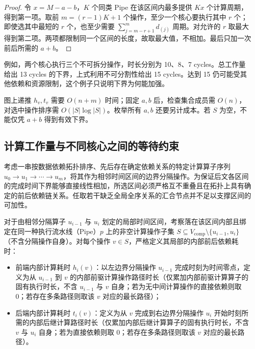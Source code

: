 \documentclass[anonymous,notoc]{gmcm2026}
\providecommand{\tightlist}{\setlength{\itemsep}{0pt}\setlength{\parskip}{0pt}}
\begin{document}
\begin{proof} 令 \(x = M - a - b\)，\(K\) 个同类 Pipe 在该区间内最多提供 \(Kx\) 个计算周期，得到第一项。取前 \(m = (r-1)K + 1\) 个操作，至少一个核心要执行其中 \(r\) 个；即使选其中最短的 \(r\) 个，也至少需要 \(\sum_{j=m-r+1}^{m} d_{(j)}\) 周期。对允许的 \(r\) 取最大得到第二项。两项都限制同一个区间的长度，故取最大值，不相加。最后只加一次前后所需的 \(a + b\)。 \end{proof}

例如，两个核心执行三个不可拆分操作，时长分别为 10、8、7 cycles。总工作量给出 13 cycles 的下界，上式利用不可分割性给出 15 cycles。达到 15 仍可能受其他依赖和资源限制，这个例子只说明下界为何能加强。

图上递推 \(h_v, t_v\) 需要 \(O(n + m)\) 时间；固定 \(a, b\) 后，检查集合成员需 \(O(n)\)，对选中操作排序需 \(O(|S| \log |S|)\)。枚举所有 \(a, b\) 还要另计成本。若 \(S\) 为空，不能仅凭 \(a + b\) 得到有效下界。

\subsection{计算工作量与不同核心之间的等待约束}

考虑一串按数据依赖拓扑排序、先后存在确定依赖关系的特定计算算子序列 \(u_0 \to u_1 \to \cdots \to u_m\)，将其作为相邻时间区间的边界分隔操作。为保证后文各区间的完成时间下界能够直接线性相加，所选区间必须严格互不重叠且在拓扑上具有确定的前后依赖链关系。任取若干缺乏全局全序关系的汇合节点并不足以支撑区间的可加性。

对于由相邻分隔算子 \(u_{i-1}\) 与 \(u_i\) 划定的局部时间区间，考察落在该区间内部且绑定在同一种执行流水线（Pipe）\(p\) 上的非空计算操作子集 \(S \subseteq V_{\mathrm{comp}} \setminus \{u_{i-1}, u_i\}\)（不含分隔操作自身）。对每个操作 \(v \in S\)，严格定义其局部的内部前后依赖耗时：

\begin{itemize}
\tightlist
\item
  前端内部计算耗时 \(h_i(v)\)：以左边界分隔操作 \(u_{i-1}\) 完成时刻为时间零点，定义为从 \(u_{i-1}\) 到 \(v\) 的内部前驱计算操作路径时长（仅累加内部前驱计算算子的固有执行时长，不含 \(u_{i-1}\) 与 \(v\) 自身；若为无中间计算操作的直接依赖则取 0；若存在多条路径则取该 \(v\) 对应的最长路径）；
\item
  后端内部计算耗时 \(t_i(v)\)：定义为从 \(v\) 完成到右边界分隔操作 \(u_i\) 开始时刻所需的内部后继计算路径时长（仅累加内部后继计算算子的固有执行时长，不含 \(v\) 与 \(u_i\) 自身；若为直接依赖则取 0；若存在多条路径则取该 \(v\) 对应的最长路径）。
\end{itemize}
\end{document}
